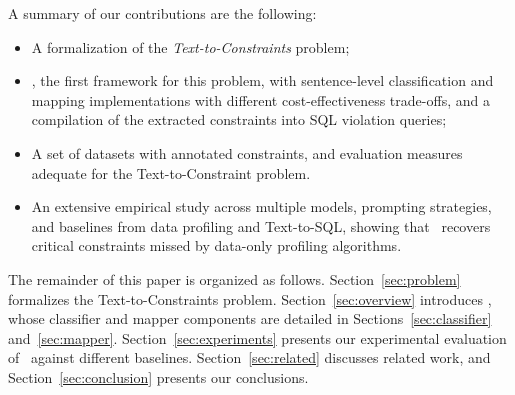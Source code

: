 A summary of our contributions are the following:
\begin{itemize}[leftmargin=0.35cm]
\item A formalization of the \emph{Text-to-Constraints} problem;
\item \system, the first framework for this problem, with sentence-level classification and mapping implementations with different cost-effectiveness trade-offs, and a compilation of the extracted constraints into SQL violation queries;
\item A set of datasets with annotated constraints, and evaluation measures adequate for the Text-to-Constraint problem.
\item An extensive empirical study across multiple models, prompting strategies, and baselines from data profiling and Text-to-SQL, showing that \system\ recovers critical constraints missed by data-only profiling algorithms.
\end{itemize}

The remainder of this paper is organized as follows. Section~\ref{sec:problem} formalizes the Text-to-Constraints problem. Section~\ref{sec:overview} introduces \system, whose classifier and mapper components are detailed in Sections~\ref{sec:classifier} and~\ref{sec:mapper}. Section~\ref{sec:experiments} presents our experimental evaluation of \system\ against different baselines. Section~\ref{sec:related} discusses related work, and Section~\ref{sec:conclusion} presents our conclusions.









